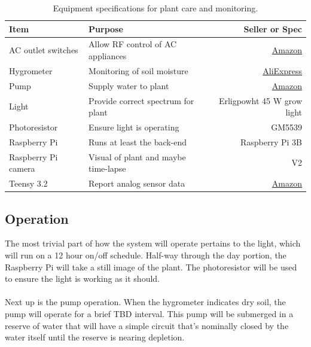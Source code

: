 \documentclass[]{article}
\begin{document}
\begin{table}[h]
\centering
\caption{Equipment specifications for plant care and monitoring.}
\begin{tabular}{l|l|r }
\textbf{Item} & \textbf{Purpose} & \textbf{Seller or Spec} \\ \hline
AC outlet switches & Allow RF control of AC appliances & \href{https://www.amazon.com/gp/product/B00DQELHBS/ref=ppx_yo_dt_b_search_asin_title?ie=UTF8\&psc=1}{Amazon} \\ \hline
Hygrometer & Monitoring of soil moisture & \href{https://www.aliexpress.com/item/32700826684.html?spm=a2g0s.9042311.0.0.770c4c4dQ7v1Z2}{AliExpress} \\ \hline 
Pump & Supply water to plant & \href{https://www.amazon.com/gp/product/B00EWENMAU/ref=ppx_yo_dt_b_search_asin_title?ie=UTF8&psc=1}{Amazon} \\ \hline 
Light & Provide correct spectrum for plant & Erligpowht 45 W grow light \\ \hline
Photoresistor & Ensure light is operating & GM5539 \\ \hline
Raspberry Pi & Runs at least the back-end & Raspberry Pi 3B \\ \hline
Raspberry Pi camera & Visual of plant and maybe time-lapse & V2 \\ \hline
Teensy 3.2 & Report analog sensor data & \href{https://www.amazon.com/gp/product/B015QUPO5Y/ref=ppx_yo_dt_b_search_asin_title?ie=UTF8&psc=1}{Amazon} 
\end{tabular}
\end{table}

\subsection{Operation}
The most trivial part of how the system will operate pertains to the light, which will run on a 12 hour on/off schedule.  Half-way through the day portion, the Raspberry Pi will take a still image of the plant.  The photoresistor will be used to ensure the light is working as it should.
\\\\
Next up is the pump operation.  When the hygrometer indicates dry soil, the pump will operate for a brief TBD interval.  This pump will be submerged in a reserve of water that will have a simple circuit that's nominally closed by the water itself until the reserve is nearing depletion.


\newpage
\end{document}
